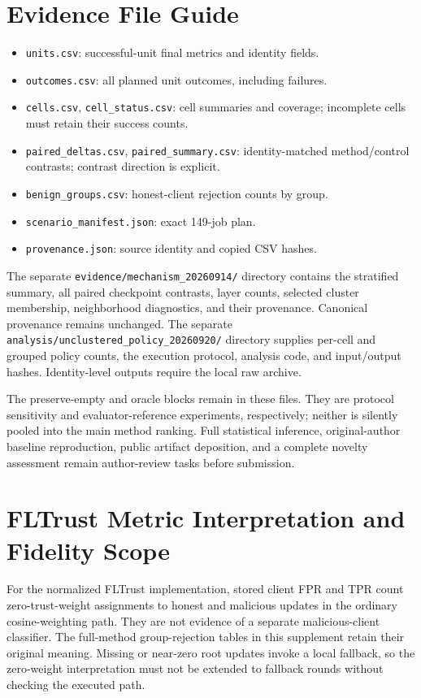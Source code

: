 \documentclass[journal]{IEEEtran}
\begin{document}
\section{Evidence File Guide}
\begin{itemize}
\item \texttt{units.csv}: successful-unit final metrics and identity fields.
\item \texttt{outcomes.csv}: all planned unit outcomes, including failures.
\item \texttt{cells.csv}, \texttt{cell\_status.csv}: cell summaries and coverage; incomplete cells must retain their success counts.
\item \texttt{paired\_deltas.csv}, \texttt{paired\_summary.csv}: identity-matched method/control contrasts; contrast direction is explicit.
\item \texttt{benign\_groups.csv}: honest-client rejection counts by group.
\item \texttt{scenario\_manifest.json}: exact 149-job plan.
\item \texttt{provenance.json}: source identity and copied CSV hashes.
\end{itemize}
The separate \texttt{evidence/mechanism\_20260914/} directory contains the stratified summary, all paired checkpoint contrasts, layer counts, selected cluster membership, neighborhood diagnostics, and their provenance. Canonical provenance remains unchanged. The separate \texttt{analysis/unclustered\_policy\_20260920/} directory supplies per-cell and grouped policy counts, the execution protocol, analysis code, and input/output hashes. Identity-level outputs require the local raw archive.

The preserve-empty and oracle blocks remain in these files. They are protocol sensitivity and evaluator-reference experiments, respectively; neither is silently pooled into the main method ranking. Full statistical inference, original-author baseline reproduction, public artifact deposition, and a complete novelty assessment remain author-review tasks before submission.
\section{FLTrust Metric Interpretation and Fidelity Scope}
For the normalized FLTrust implementation, stored client FPR and TPR count zero-trust-weight assignments to honest and malicious updates in the ordinary cosine-weighting path. They are not evidence of a separate malicious-client classifier. The full-method group-rejection tables in this supplement retain their original meaning. Missing or near-zero root updates invoke a local fallback, so the zero-weight interpretation must not be extended to fallback rounds without checking the executed path.
\end{document}
